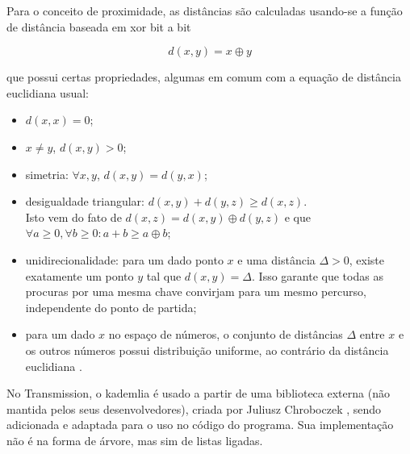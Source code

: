 Para o conceito de proximidade, as distâncias são calculadas usando-se a função de
distância baseada em \gls{xor} bit a bit

\begin{equation*}
    d(x,y) = x \oplus y
\end{equation*}

que possui certas propriedades, algumas em comum com a equação de distância euclidiana
usual:

\begin{itemize}
    \item $d(x,x) = 0$;
    \item $x \neq y$, $d(x,y) > 0$;
    \item simetria: $\forall x,y$, $d(x,y) = d(y,x)$;
    \item desigualdade triangular: $d(x,y) + d(y,z) \geq d(x,z)$. \\
        Isto vem do fato de $d(x,z) = d(x,y) \oplus d(y,z)$ e que $\forall a \geq 0,
        \forall b \geq 0 : a + b \geq a \oplus b$;
    \item unidirecionalidade: para um dado ponto $x$ e uma distância $\Delta > 0$,
        existe exatamente um ponto $y$ tal que $d(x,y) = \Delta$. Isso garante que todas
        as procuras por uma mesma chave convirjam para um mesmo percurso, independente
        do ponto de partida;
    \item para um dado $x$ no espaço de números, o conjunto de distâncias $\Delta$ entre
        $x$ e os outros números possui distribuição uniforme, ao contrário da distância
        euclidiana \cite{bittorrentcom:dht}.
\end{itemize}

No Transmission, o \gls*{kademlia} é usado a partir de uma biblioteca externa (não
mantida pelos seus desenvolvedores), criada por Juliusz Chroboczek \cite{repo:dht-c},
sendo adicionada e adaptada para o uso no código do programa. Sua implementação não é
na forma de árvore, mas sim de listas ligadas.

